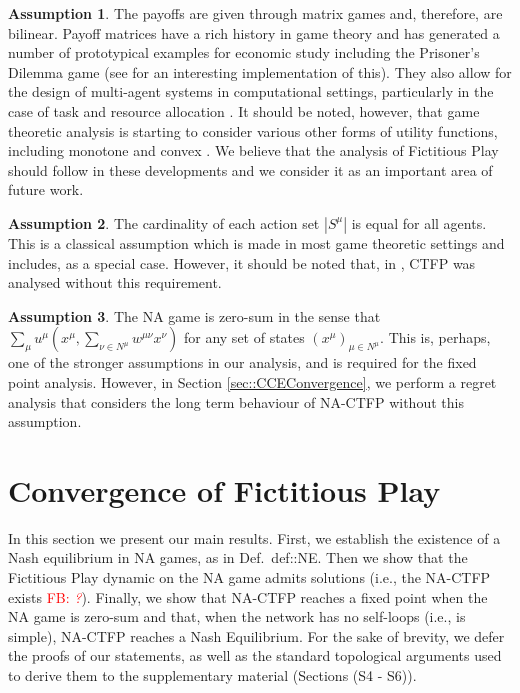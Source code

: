 \documentclass{article}
\theoremstyle{definition}
\newtheorem{assumption}{Assumption}
\newcommand{\fb}[1]{\textcolor{red}{FB: \textit{#1}}}
\newcommand{\actionset}[1]{S^{#1}}
\newcommand{\wmunu}{w^{\mu \nu}}
\newcommand{\xmu}{x^{\mu}}
\newcommand{\xnu}{x^{\nu}}
\newcommand{\weightedsum}{ \sum_{\nu \in N^\mu} \wmunu \xnu}
\begin{document}
  \begin{assumption}\label{ass::matrixgame}
    The payoffs are given through matrix games and, therefore, are bilinear. Payoff matrices
    have a rich history in game theory and has generated a number of prototypical examples for
    economic study including the Prisoner's Dilemma game (see \cite{Axelrod1980} for an interesting
    implementation of this). They also allow for the design of multi-agent systems in
    computational settings, particularly in the case of task and resource allocation \cite{Nisan2007}. It should be noted, however, that game
    theoretic analysis is starting to consider various other forms of utility functions,
    including monotone \cite{Tatarenko2020} and convex \cite{Parise2020}. We believe that the analysis of
    Fictitious Play should follow in these developments and we consider it as an important area
    of future work.
  \end{assumption}

  \begin{assumption}\label{ass::sameactions}
    The cardinality of each action set $|\actionset{\mu}|$ is equal for all agents. This is
    a classical assumption which is made in most game theoretic settings and includes, as a
    special case. However, it should be noted that,
    in \cite{Ewerhart2020}, CTFP was analysed without this requirement.  
  \end{assumption}

  \begin{assumption}\label{ass::zerosum}
    The NA game is zero-sum in the sense that $\sum_{\mu} u^\mu(\xmu, \weightedsum)$ for any set
    of states $(x^\mu)_{\mu \in N^\mu}$. This is, perhaps, one of the stronger assumptions in
    our analysis, and is required for the fixed point analysis. However, in Section
    \ref{sec::CCEConvergence}, we perform a regret analysis that considers the long term
    behaviour of NA-CTFP without this assumption.
  \end{assumption}

\section{Convergence of Fictitious Play}
\label{sec::CTFPAnalysis}

  
  In this section we present our main results. First, we establish the
  existence of a Nash equilibrium in NA games, as in
  Def.~\refname{def::NE}. Then we show that the Fictitious Play
  dynamic on the NA game admits solutions (i.e., the NA-CTFP
  exists \fb{?}). Finally, we show that NA-CTFP reaches a fixed point when
  the NA game is zero-sum and that, when the network has no self-loops
  (i.e., is simple), NA-CTFP reaches a Nash Equilibrium. For the sake
  of brevity, we defer the proofs of our statements, as well as the
  standard topological arguments used to derive them to the
  supplementary material (Sections (S4 - S6)).
\end{document}
